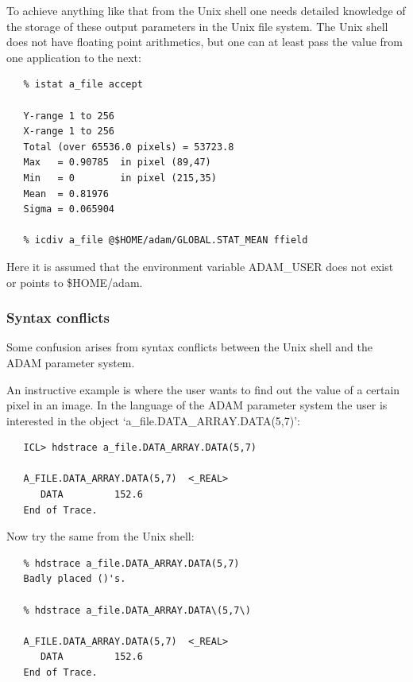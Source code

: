 \documentclass[11pt,twoside]{article}
\begin{document}
   To achieve anything like that from the Unix shell one needs detailed
   knowledge of the storage of these output parameters in the Unix file
   system. The Unix shell does not have floating point arithmetics, but
   one can at least pass the value from one application to the next:

\begin{verbatim}
   % istat a_file accept

   Y-range 1 to 256
   X-range 1 to 256
   Total (over 65536.0 pixels) = 53723.8
   Max   = 0.90785  in pixel (89,47)
   Min   = 0        in pixel (215,35)
   Mean  = 0.81976
   Sigma = 0.065904

   % icdiv a_file @$HOME/adam/GLOBAL.STAT_MEAN ffield
\end{verbatim}

   Here it is assumed that the environment variable ADAM\_USER does not
   exist or points to \$HOME/adam.


\subsubsection{\label{paramssyntax}Syntax conflicts}

   Some confusion arises from syntax conflicts between the Unix shell
   and the ADAM parameter system.

   An instructive example is where the user wants to find out the value
   of a certain pixel in an image. In the language of
   the ADAM parameter system the user is interested in the object
   `a\_file.DATA\_ARRAY.DATA(5,7)':

\begin{verbatim}
   ICL> hdstrace a_file.DATA_ARRAY.DATA(5,7)

   A_FILE.DATA_ARRAY.DATA(5,7)  <_REAL>
      DATA         152.6
   End of Trace.
\end{verbatim}

   Now try the same from the Unix shell:

\begin{verbatim}
   % hdstrace a_file.DATA_ARRAY.DATA(5,7)
   Badly placed ()'s.

   % hdstrace a_file.DATA_ARRAY.DATA\(5,7\)

   A_FILE.DATA_ARRAY.DATA(5,7)  <_REAL>
      DATA         152.6
   End of Trace.
\end{verbatim}
\end{document}
